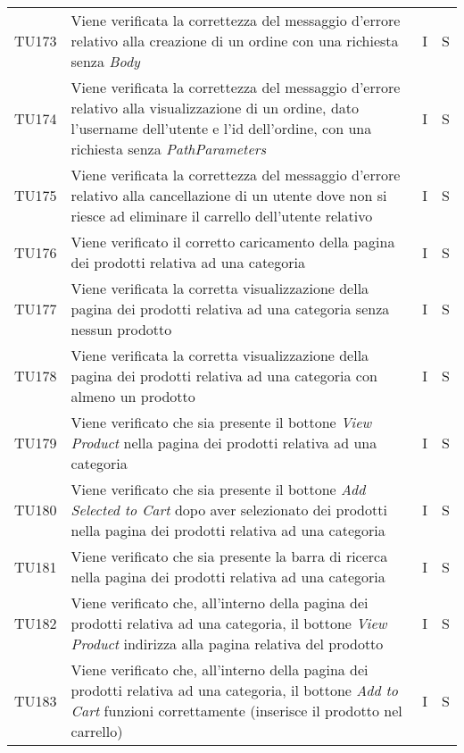 {\begin{longtable}{C{2cm} C{9.6cm} C{1.5cm} C{1cm}}
TU173 & Viene verificata la correttezza del messaggio d'errore relativo alla creazione di un ordine con una richiesta senza \textit{Body} & I & S\\

TU174 & Viene verificata la correttezza del messaggio d'errore relativo alla visualizzazione di un ordine, dato l'username dell'utente e l'id dell'ordine, con una richiesta senza \textit{PathParameters} & I & S\\

TU175 & Viene verificata la correttezza del messaggio d'errore relativo alla cancellazione di un utente dove non si riesce ad eliminare il carrello dell'utente relativo & I & S\\

TU176 & Viene verificato il corretto caricamento della pagina dei prodotti relativa ad una categoria & I & S\\

TU177 & Viene verificata la corretta visualizzazione della pagina dei prodotti relativa ad una categoria senza nessun prodotto & I & S\\

TU178 & Viene verificata la corretta visualizzazione della pagina dei prodotti relativa ad una categoria con almeno un prodotto & I & S\\

TU179 & Viene verificato che sia presente il bottone \textit{View Product} nella pagina dei prodotti relativa ad una categoria & I & S\\

TU180 & Viene verificato che sia presente il bottone \textit{Add Selected to Cart} dopo aver selezionato dei prodotti nella pagina dei prodotti relativa ad una categoria & I & S\\

TU181 & Viene verificato che sia presente la barra di ricerca nella pagina dei prodotti relativa ad una categoria & I & S\\

TU182 & Viene verificato che, all'interno della pagina dei prodotti relativa ad una categoria, il bottone \textit{View Product} indirizza alla pagina relativa del prodotto & I & S\\

TU183 & Viene verificato che, all'interno della pagina dei prodotti relativa ad una categoria, il bottone \textit{Add to Cart} funzioni correttamente (inserisce il prodotto nel carrello) & I & S\\


\end{longtable}}
